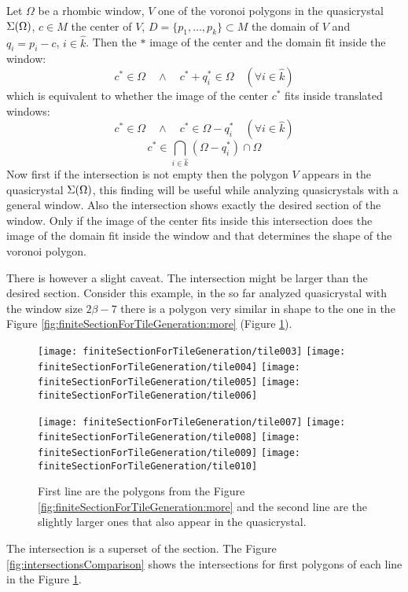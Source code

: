 \documentclass[text.tex]{subfiles}
\begin{document}
Let $\Omega$ be a rhombic window, $V$ one of the voronoi polygons in the quasicrystal $\Sigma(\Omega)$, $c\in M$ the center of $V$, $D = \{p_1,\dots,p_k\}\subset M$ the domain of $V$ and $q_i = p_i - c$, $i\in\hat{k}$.
Then the $\ast$ image of the center and the domain fit inside the window:
$$c^\ast\in\Omega \quad\wedge\quad c^\ast + q_i^\ast\in\Omega \quad(\forall i\in\hat{k})$$
which is equivalent to whether the image of the center $c^\ast$ fits inside translated windows:
$$c^\ast\in\Omega \quad\wedge\quad c^\ast\in\Omega-q_i^\ast \quad(\forall i\in\hat{k})$$
$$c^\ast\in\bigcap\limits_{i\in\hat{k}}(\Omega-q_i^\ast)\cap\Omega$$
Now first if the intersection is not empty then the polygon $V$ appears in the quasicrystal $\Sigma(\Omega)$, this finding will be useful while analyzing quasicrystals with a general window. Also the intersection shows exactly the desired section of the window. Only if the image of the center fits inside this intersection does the image of the domain fit inside the window and that determines the shape of the voronoi polygon. 

There is however a slight caveat. The intersection might be larger than the desired section. Consider this example, in the so far analyzed quasicrystal with the window size $2\beta-7$ there is a polygon very similar in shape to the one in the Figure \ref{fig:finiteSectionForTileGeneration:more} (Figure \ref{fig:finiteSectionForTileGeneration:bigger}).
\begin{figure}[h]
\centering
\texttt{[image: finiteSectionForTileGeneration/tile003]}
\texttt{[image: finiteSectionForTileGeneration/tile004]}
\texttt{[image: finiteSectionForTileGeneration/tile005]}
\texttt{[image: finiteSectionForTileGeneration/tile006]}

\texttt{[image: finiteSectionForTileGeneration/tile007]}
\texttt{[image: finiteSectionForTileGeneration/tile008]}
\texttt{[image: finiteSectionForTileGeneration/tile009]}
\texttt{[image: finiteSectionForTileGeneration/tile010]}
\caption{First line are the polygons from the Figure \ref{fig:finiteSectionForTileGeneration:more} and the second line are the slightly larger ones that also appear in the quasicrystal.}
\label{fig:finiteSectionForTileGeneration:bigger}
\end{figure}

The intersection is a superset of the section. The Figure \ref{fig:intersectionsComparison} shows the intersections for first polygons of each line in the Figure \ref{fig:finiteSectionForTileGeneration:bigger}.
\end{document}
